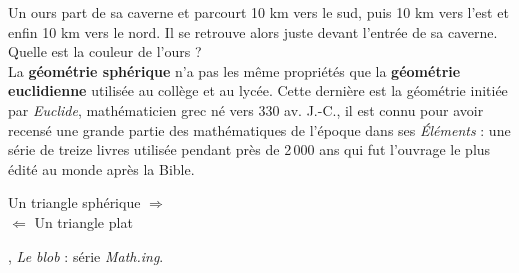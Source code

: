 \vspace*{-7mm}

\vspace*{-2mm}

\vspace*{-3mm}
\begin{debat}
   \begin{changemargin}{-15mm}{-15mm}
   \og Un ours part de sa caverne et parcourt 10 km vers le sud, puis 10 km vers l'est et enfin 10 km vers le nord. Il se retrouve alors juste devant l'entrée de sa caverne. Quelle est la couleur de l'ours ? \fg \\
   La {\bf géométrie sphérique} n'a pas les même propriétés que la {\bf géométrie euclidienne} utilisée au collège et au lycée. Cette dernière est la géométrie initiée par {\it Euclide}, mathématicien grec né vers 330 av. J.-C., il est connu pour avoir recensé une grande partie des mathématiques de l'époque dans ses {\it Éléments} : une série de treize livres utilisée pendant près de 2\,000 ans qui fut l'ouvrage le plus édité au monde après la Bible.
   \end{changemargin}

   \begin{minipage}{5cm}
      \scalebox{0.8}{
      \begin{pspicture}(-1,0.5)(4,3)
         \pspolygon[linecolor=C1](1,0)(4,0)(3,3.25)
      \end{pspicture}
      }
   \end{minipage}
   \textcolor{B1}{
   \begin{minipage}{5cm}
      \flushright Un triangle \og sphérique \fg{} $\Longrightarrow$ \\
      \flushleft $\Longleftarrow$ Un triangle \og plat \fg \\     
   \end{minipage}}
   \begin{minipage}{5cm}
   \end{minipage} 
   \begin{cadre}[B2][J4]
      \begin{center}
         , {\it Le blob} : série {\it Math.ing}.
      \end{center}
   \end{cadre}
\end{debat}
